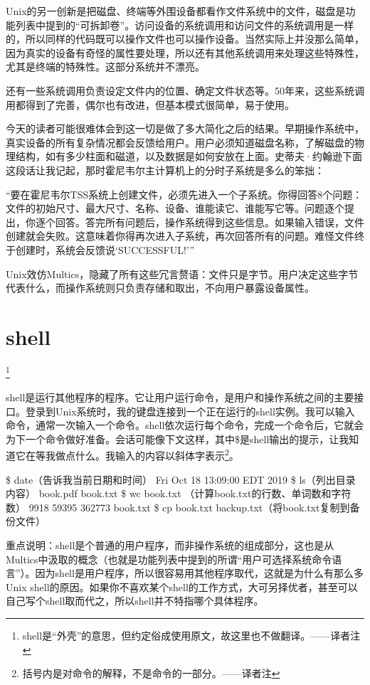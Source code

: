 \documentclass[a4paper,12pt,UTF8,twoside]{ctexbook}
\begin{document}
Unix的另一创新是把磁盘、终端等外围设备都看作文件系统中的文件，磁盘是功能列表中提到的“可拆卸卷”。访问设备的系统调用和访问文件的系统调用是一样的，所以同样的代码既可以操作文件也可以操作设备。当然实际上并没那么简单，因为真实的设备有奇怪的属性要处理，所以还有其他系统调用来处理这些特殊性，尤其是终端的特殊性。这部分系统并不漂亮。

还有一些系统调用负责设定文件内的位置、确定文件状态等。50年来，这些系统调用都得到了完善，偶尔也有改进，但基本模式很简单，易于使用。

今天的读者可能很难体会到这一切是做了多大简化之后的结果。早期操作系统中，真实设备的所有复杂情况都会反馈给用户。用户必须知道磁盘名称，了解磁盘的物理结构，如有多少柱面和磁道，以及数据是如何安放在上面。史蒂夫·约翰逊下面这段话让我记起，那时霍尼韦尔主计算机上的分时子系统是多么的笨拙：

“要在霍尼韦尔TSS系统上创建文件，必须先进入一个子系统。你得回答8个问题：文件的初始尺寸、最大尺寸、名称、设备、谁能读它、谁能写它等。问题逐个提出，你逐个回答。答完所有问题后，操作系统得到这些信息。如果输入错误，文件创建就会失败。这意味着你得再次进入子系统，再次回答所有的问题。难怪文件终于创建时，系统会反馈说‘SUCCESSFUL!’”

Unix效仿Multics，隐藏了所有这些冗言赘语：文件只是字节。用户决定这些字节代表什么，而操作系统则只负责存储和取出，不向用户暴露设备属性。

\section{shell}

\footnote{shell是“外壳”的意思，但约定俗成使用原文，故这里也不做翻译。——译者注}

shell是运行其他程序的程序。它让用户运行命令，是用户和操作系统之间的主要接口。登录到Unix系统时，我的键盘连接到一个正在运行的shell实例。我可以输入命令，通常一次输入一个命令。shell依次运行每个命令，完成一个命令后，它就会为下一个命令做好准备。会话可能像下文这样，其中\$是shell输出的提示，让我知道它在等我做点什么。我输入的内容以斜体字表示\footnote{括号内是对命令的解释，不是命令的一部分。——译者注}。

\$ date（告诉我当前日期和时间） Fri Oct 18 13:09:00 EDT 2019 \$ ls（列出目录内容） book.pdf book.txt \$ wc book.txt （计算book.txt的行数、单词数和字符数） 9918 59395 362773 book.txt \$ cp book.txt backup.txt（将book.txt复制到备份文件）

重点说明：shell是个普通的用户程序，而非操作系统的组成部分，这也是从Multics中汲取的概念（也就是功能列表中提到的所谓“用户可选择系统命令语言”）。因为shell是用户程序，所以很容易用其他程序取代，这就是为什么有那么多Unix shell的原因。如果你不喜欢某个shell的工作方式，大可另择优者，甚至可以自己写个shell取而代之，所以shell并不特指哪个具体程序。
\end{document}
